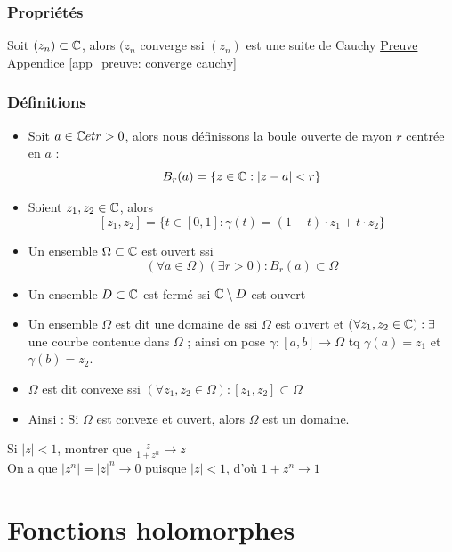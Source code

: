 \documentclass[12pt,a4paper]{article}
\newcommand{\zn}{\ensuremath{(z_n)} }
\begin{document}
\subsubsection*{Propriétés}
Soit $(z_n) \subset \mathbb{C}$, alors $(z_n$ converge ssi \zn est une suite de Cauchy \uline{Preuve Appendice \ref{app_preuve: converge cauchy}}

\subsubsection{Définitions}
\begin{itemize}
	\item 	Soit $a \in \mathbb{C} et r>0$, alors nous définissons la boule ouverte de rayon $r$ centrée en $a$ :
			\[B_r(a) = \{z\in \mathbb{C} : |z-a| < r\}\] 
	\item 	Soient $z_1,z_2 \in  \mathbb{C}$, alors 
			\[[z_1,z_2] = \{t \in [0,1] : \gamma(t) = (1-t)\cdot z_1 + t \cdot z_2\}\]
	\item 	Un ensemble $\Omega \subset \mathbb{C}$ est ouvert ssi \[(\forall a \in \Omega)(\exists r > 0) : B_r(a) \subset \Omega\]
	\item 	Un ensemble $D \subset \mathbb{C}$ est fermé ssi $\mathbb{C} \setminus D$ est ouvert
	\item 	Un ensemble $\Omega$ est dit une domaine de \C ssi $\Omega$ est ouvert et ($\forall z_1, z_2 \in \mathbb{C}) : \exists$ une courbe contenue dans $\Omega$ ; ainsi on pose $\gamma : [a,b] \to \Omega$ tq $\gamma(a) = z_1$ et $\gamma(b) = z_2$.
	\item 	$\Omega$ est dit convexe ssi $(\forall z_1,z_2 \in \Omega) : [z_1,z_2] \subset \Omega$
	\item 	Ainsi : Si $\Omega$ est convexe et ouvert, alors $\Omega$ est un domaine.
\end{itemize}
\begin{exemple}
	Si $|z| < 1$, montrer que $\frac{z}{1+z^n} \to z$\\
	On a que $|z^n| = |z|^n \to 0$ puisque $|z| < 1$, d'où $1+z^n \to 1$
\end{exemple}

\section{Fonctions holomorphes}
\setcounter{equation}{0}
\end{document}
